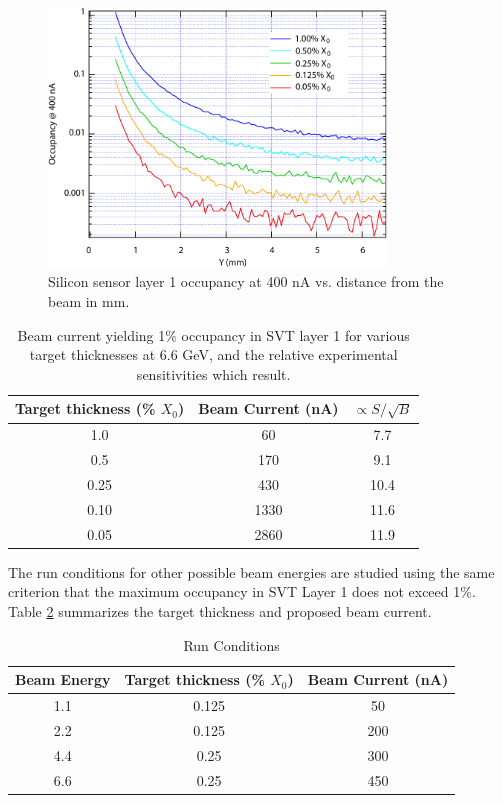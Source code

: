 \begin{figure}[t]
\includegraphics[width=0.8\textwidth]{performance/occupancy.pdf}
\caption{\small{Silicon sensor layer 1 occupancy at 400 nA vs. distance from the
beam in mm.}}
\label{fig:occup}
\end{figure}

\begin{table}[h]
\begin{center}
\begin{tabular}{|c|c|c|} \hline
  Target thickness (\% $X_0$) & Beam Current (nA) & $\propto S/\sqrt{B}$ \\ \hline
  1.0 & 60 & 7.7 \\ \hline
  0.5 & 170 & 9.1 \\ \hline
  0.25 & 430 & 10.4 \\ \hline
  0.10 & 1330 & 11.6 \\ \hline
  0.05 & 2860 & 11.9 \\ \hline
\end{tabular}
\end{center}
\caption{\small{Beam current yielding 1\% occupancy in SVT layer 1 for various target 
thicknesses at 6.6 GeV, and the relative experimental sensitivities which result.}}
\label{tab:occup}
\end{table}

The run conditions for other possible beam energies are studied using the same criterion that the maximum occupancy 
in SVT Layer 1 does not exceed 1\%. Table \ref{tab:runc} summarizes the target thickness and proposed beam current. 

\begin{table}[h]
\begin{center}
\begin{tabular}{|c|c|c|} \hline
  Beam Energy & Target thickness (\% $X_0$) & Beam Current (nA) \\ \hline
  1.1 & 0.125 & 50 \\ \hline
  2.2 & 0.125 & 200 \\ \hline
  4.4 & 0.25  & 300 \\ \hline
  6.6 & 0.25 & 450 \\ \hline
\end{tabular}
\end{center}
\caption{\small{Run Conditions}}
\label{tab:runc}
\end{table}

